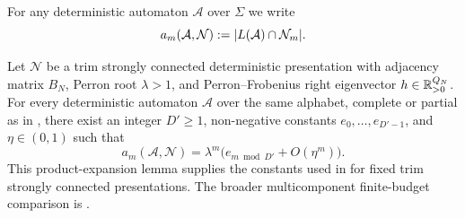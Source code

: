 For any deterministic automaton \(\mathcal A\) over \(\Sigma\) we write
\[
  a_m(\mathcal A,\mathcal N)
  :=\lvert L(\mathcal A)\cap\mathcal N_m \rvert.
\]

\begin{lemma}
  \label{lem:substochastic-product-expansion}
  Let \(\mathcal N\) be a trim strongly connected deterministic
  presentation with adjacency matrix \(B_N\), Perron root
  \(\lambda>1\), and Perron--Frobenius right eigenvector
  \(h\in\mathbb{R}_{>0}^{Q_N}\). For every deterministic automaton
  \(\mathcal A\) over the same alphabet, complete or partial as in
  , there exist an integer
  \(D'\ge 1\), non-negative constants \(e_0,\dots,e_{D'-1}\), and
  \(\eta\in(0,1)\) such that
  \[
    a_m(\mathcal A,\mathcal N)
    =\lambda^m\bigl(e_{m\bmod D'}+O(\eta^m)\bigr).
  \]
  This product-expansion lemma supplies the constants used in
   for fixed trim strongly connected
  presentations. The broader multicomponent finite-budget comparison is
  .
\end{lemma}

